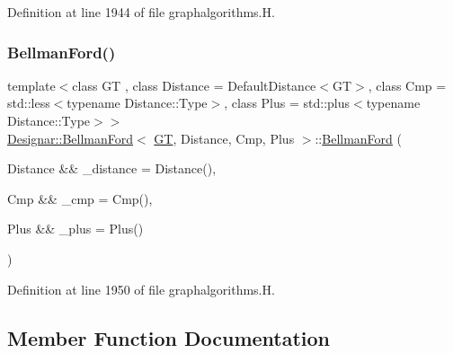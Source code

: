 Definition at line 1944 of file graphalgorithms.\+H.

\mbox{\label{class_designar_1_1_bellman_ford_adfac9f09fe6da285aaa8f8d84e9d7982}} 
\subsubsection{\texorpdfstring{Bellman\+Ford()}{BellmanFord()}\hspace{0.1cm}{\footnotesize\ttfamily [2/2]}}
{\footnotesize\ttfamily template$<$class GT , class Distance  = Default\+Distance$<$\+G\+T$>$, class Cmp  = std\+::less$<$typename Distance\+::\+Type$>$, class Plus  = std\+::plus$<$typename Distance\+::\+Type$>$$>$ \\
\hyperlink{class_designar_1_1_bellman_ford}{Designar\+::\+Bellman\+Ford}$<$ \hyperlink{demo-buildgraph_8_c_a3001c40d2c31ca87ed96cd7d1334a55e}{GT}, Distance, Cmp, Plus $>$\+::\hyperlink{class_designar_1_1_bellman_ford}{Bellman\+Ford} (\begin{DoxyParamCaption}\item[{Distance \&\&}]{\+\_\+distance = {\ttfamily Distance()},  }\item[{Cmp \&\&}]{\+\_\+cmp = {\ttfamily Cmp()},  }\item[{Plus \&\&}]{\+\_\+plus = {\ttfamily Plus()} }\end{DoxyParamCaption})\hspace{0.3cm}{\ttfamily [inline]}}



Definition at line 1950 of file graphalgorithms.\+H.



\subsection{Member Function Documentation}
\mbox{\label{class_designar_1_1_bellman_ford_a3057f65cedb7e6d214ed838c810b557e}} 

